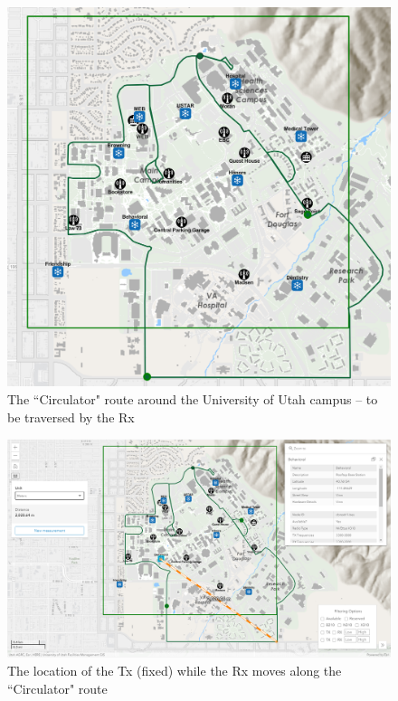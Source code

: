 \documentclass[12pt]{article}
\newcommand{\areaofinterestfigwidth}{1.0\textwidth}
\begin{document}
\begin{itemize}
            \begin{figure}
                \centering
                \includegraphics[width=\areaofinterestfigwidth]{figs/Circulator_Route_2.png}
                \caption{The ``Circulator" route around the University of Utah campus -- to be traversed by the Rx}
                \label{fig:Rx_3}
            \end{figure}
            \begin{figure}
                \centering
                \includegraphics[width=\areaofinterestfigwidth]{figs/Circulator_Route_2_Behavioral_Tx.png}
                \caption{The location of the Tx (fixed) while the Rx moves along the ``Circulator" route}

\end{figure}
\end{itemize}
\end{document}
